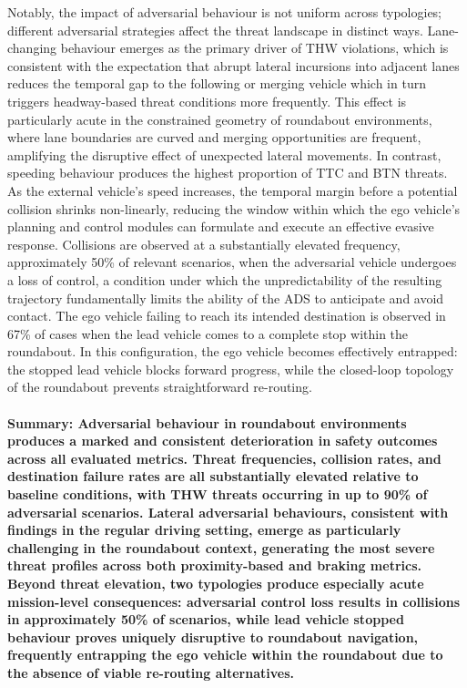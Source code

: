 Notably, the impact of adversarial behaviour is not uniform across typologies; different adversarial strategies affect the threat landscape in distinct ways. Lane-changing behaviour emerges as the primary driver of THW violations, which is consistent with the expectation that abrupt lateral incursions into adjacent lanes reduces the temporal gap to the following or merging vehicle which in turn triggers headway-based threat conditions more frequently. This effect is particularly acute in the constrained geometry of roundabout environments, where lane boundaries are curved and merging opportunities are frequent, amplifying the disruptive effect of unexpected lateral movements.
In contrast, speeding behaviour produces the highest proportion of TTC and BTN threats. %
As the external vehicle's speed increases, the temporal margin before a potential collision shrinks non-linearly, reducing the window within which the ego vehicle's planning and control modules can formulate and execute an effective evasive response. 
Collisions are observed at a substantially elevated frequency, approximately 50\% of relevant scenarios, when the adversarial vehicle undergoes a loss of control, a condition under which the unpredictability of the resulting trajectory fundamentally limits the ability of the ADS to anticipate and avoid contact. 
The ego vehicle failing to reach its intended destination is observed in 67\% of cases when the lead vehicle comes to a complete stop within the roundabout. In this configuration, the ego vehicle becomes effectively entrapped: the stopped lead vehicle blocks forward progress, while the closed-loop topology of the roundabout prevents straightforward re-routing. 
\paragraph{Summary: Adversarial behaviour in roundabout environments produces a marked and consistent deterioration in safety outcomes across all evaluated metrics. Threat frequencies, collision rates, and destination failure rates are all substantially elevated relative to baseline conditions, with THW threats occurring in up to 90\% of adversarial scenarios. Lateral adversarial behaviours, consistent with findings in the regular driving setting, emerge as particularly challenging in the roundabout context, generating the most severe threat profiles across both proximity-based and braking metrics. Beyond threat elevation, two typologies produce especially acute mission-level consequences: adversarial control loss results in collisions in approximately 50\% of scenarios, while lead vehicle stopped behaviour proves uniquely disruptive to roundabout navigation, frequently entrapping the ego vehicle within the roundabout due to the absence of viable re-routing alternatives.}

